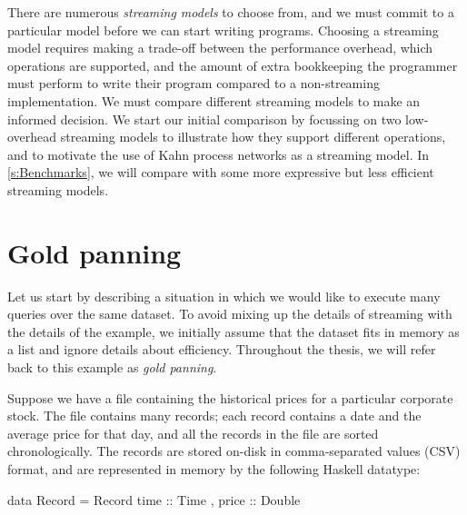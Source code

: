 There are numerous \emph{streaming models} to choose from, and we must commit to a particular model before we can start writing programs.
Choosing a streaming model requires making a trade-off between the performance overhead, which operations are supported, and the amount of extra bookkeeping the programmer must perform to write their program compared to a non-streaming implementation.
We must compare different streaming models to make an informed decision.
We start our initial comparison by focussing on two low-overhead streaming models to illustrate how they support different operations, and to motivate the use of Kahn process networks as a streaming model.
In \cref{s:Benchmarks}, we will compare with some more expressive but less efficient streaming models.

\section{Gold panning}
\label{taxonomy/gold-panning}
Let us start by describing a situation in which we would like to execute many queries over the same dataset.
To avoid mixing up the details of streaming with the details of the example, we initially assume that the dataset fits in memory as a list and ignore details about efficiency.
Throughout the thesis, we will refer back to this example as \emph{gold panning}.

Suppose we have a file containing the historical prices for a particular corporate stock.
The file contains many records; each record contains a date and the average price for that day, and all the records in the file are sorted chronologically.
The records are stored on-disk in comma-separated values (CSV) format, and are represented in memory by the following Haskell datatype:

\begin{haskell}
data Record = Record
 { time  :: Time
 , price :: Double }
\end{haskell}

